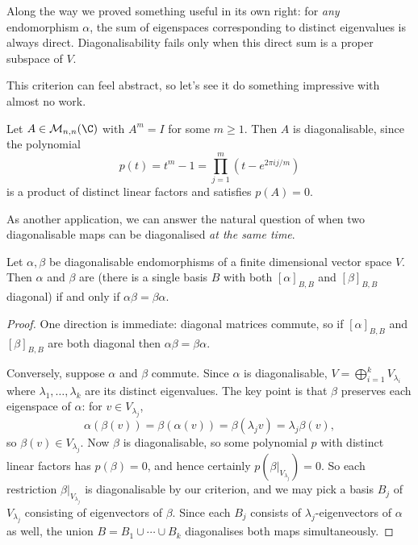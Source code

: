 \begin{remark}
    Along the way we proved something useful in its own right: for \emph{any} endomorphism $\alpha$, the sum of eigenspaces corresponding to distinct eigenvalues is always direct. Diagonalisability fails only when this direct sum is a proper subspace of $V$.
\end{remark}

This criterion can feel abstract, so let's see it do something impressive with almost no work.

\begin{example}
    Let $A \in \mathcal{M}_{n,n}(\C)$ with $A^m = I$ for some $m \geq 1$. Then $A$ is diagonalisable, since the polynomial
    $$
    p(t) = t^m - 1 = \prod_{j = 1}^{m} (t - e^{2\pi i j / m})
    $$
    is a product of distinct linear factors and satisfies $p(A) = 0$.
\end{example}

As another application, we can answer the natural question of when two diagonalisable maps can be diagonalised \emph{at the same time}.

\begin{theorem}
    Let $\alpha, \beta$ be diagonalisable endomorphisms of a finite dimensional vector space $V$. Then $\alpha$ and $\beta$ are  (there is a single basis $B$ with both $[\alpha]_{B,B}$ and $[\beta]_{B,B}$ diagonal) if and only if $\alpha\beta = \beta\alpha$.
\end{theorem}
\begin{proof}
    One direction is immediate: diagonal matrices commute, so if $[\alpha]_{B,B}$ and $[\beta]_{B,B}$ are both diagonal then $\alpha\beta = \beta\alpha$.

    Conversely, suppose $\alpha$ and $\beta$ commute. Since $\alpha$ is diagonalisable, $V = \bigoplus_{i = 1}^k V_{\lambda_i}$ where $\lambda_1, \dots, \lambda_k$ are its distinct eigenvalues. The key point is that $\beta$ preserves each eigenspace of $\alpha$: for $v \in V_{\lambda_j}$,
    $$
    \alpha(\beta(v)) = \beta(\alpha(v)) = \beta(\lambda_j v) = \lambda_j \beta(v),
    $$
    so $\beta(v) \in V_{\lambda_j}$. Now $\beta$ is diagonalisable, so some polynomial $p$ with distinct linear factors has $p(\beta) = 0$, and hence certainly $p(\beta|_{V_{\lambda_j}}) = 0$. So each restriction $\beta|_{V_{\lambda_j}}$ is diagonalisable by our criterion, and we may pick a basis $B_j$ of $V_{\lambda_j}$ consisting of eigenvectors of $\beta$. Since each $B_j$ consists of $\lambda_j$-eigenvectors of $\alpha$ as well, the union $B = B_1 \cup \cdots \cup B_k$ diagonalises both maps simultaneously.
\end{proof}

